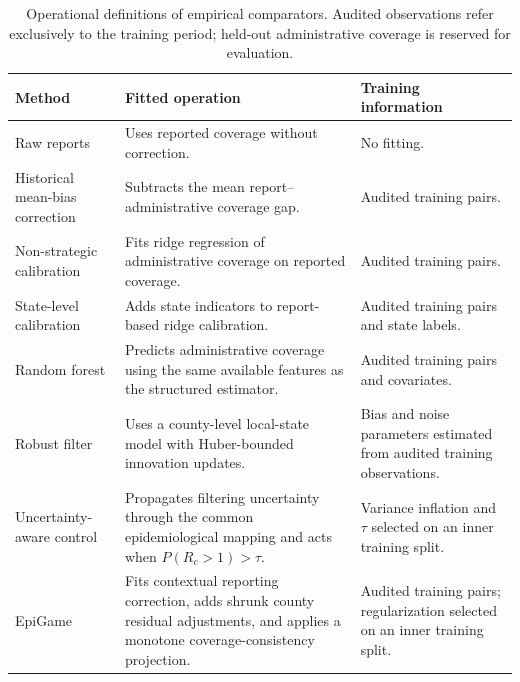 \documentclass[sigconf,review]{acmart}
\newcommand{\model}{EpiGame}
\begin{document}
\begin{table}[t]
\centering
\caption{Operational definitions of empirical comparators.
Audited observations refer exclusively to the training
period; held-out administrative coverage is reserved for
evaluation.}
\label{tab:baseline-definitions}
\small
\setlength{\tabcolsep}{4pt}
\renewcommand{\arraystretch}{1.05}
\begin{tabularx}{\textwidth}{
@{}
>{\raggedright\arraybackslash}p{}
>{\raggedright\arraybackslash}X
>{\raggedright\arraybackslash}p{}
@{}}
\toprule
Method & Fitted operation & Training information \\
\midrule
Raw reports
& Uses reported coverage without correction.
& No fitting. \\

Historical mean-bias correction
& Subtracts the mean report--administrative coverage gap.
& Audited training pairs. \\

Non-strategic calibration
& Fits ridge regression of administrative coverage on
reported coverage.
& Audited training pairs. \\

State-level calibration
& Adds state indicators to report-based ridge calibration.
& Audited training pairs and state labels. \\

Random forest
& Predicts administrative coverage using the same available
features as the structured estimator.
& Audited training pairs and covariates. \\

Robust filter
& Uses a county-level local-state model with
Huber-bounded innovation updates.
& Bias and noise parameters estimated from audited
training observations. \\

Uncertainty-aware control
& Propagates filtering uncertainty through the common
epidemiological mapping and acts when
$P(R_c>1)>\tau$.
& Variance inflation and $\tau$ selected on an
inner training split. \\

\model{}
& Fits contextual reporting correction, adds shrunk
county residual adjustments, and applies a monotone
coverage-consistency projection.
& Audited training pairs; regularization selected on
an inner training split. \\
\bottomrule
\end{tabularx}
\end{table}
\end{document}
